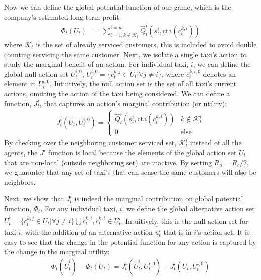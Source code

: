 \documentclass[journal]{IEEEtran}
\newcommand{\cta}{\mathrm{cta}}
\begin{document}
Now we can define the global potential function of our game, which is the company's estimated long-term profit. 
\begin{align*}
    \Phi_t(U_t) &= \sum_{i = 1, k \not \in \mathcal{K}_t}^{i=n_i} \hat{Q}_t^i( s^i_t, \cta(c^{k,i}_t)) 
\end{align*}
where $\mathcal{K}_t$ is the set of already serviced customers, this is included to avoid double counting servicing the same customer. 
Next, we isolate a single taxi's action to study the marginal benefit of an action. For individual taxi, $i$, we can define the global null action set $U^{i,0}_t$, $U^{i,0}_t = \{ c^{k,j}_t \in U_t | \forall j \neq i \}$, where $c^{k,i,0}_t$ denotes an element in  $U^{i,0}_t$. Intuitively, the null action set is the set of all taxi's current actions, omitting the action of the taxi being considered. We can define a function, $J_t^i$, that captures an action's marginal contribution (or utility):
\begin{align*}
    J_t^i(U_t, U^{i,0}_t) = 
    \begin{cases}
        \hat{Q}^i_t(s^i_t, \cta(c^{k,i}_t)) & k \not \in \mathcal{K}^i_t \\
        0 & \mathrm{else}
    \end{cases}
\end{align*}
By checking over the neighboring customer serviced set, $\mathcal{K}^i_t$ instead of all the agents, the $J^i$ function is local because the elements of the global action set $U_t$ that are non-local (outside neighboring set) are inactive. By setting $R_u = R_c/2$, we guarantee that any set of taxi's that can sense the same customers will also be neighbors. 

Next, we show that $J^i_t$ is indeed the marginal contribution on global potential function, $\Phi_t$. For any individual taxi, $i$, we define the global alternative action set $\tilde{U}^i_t = \{ c^{k,j}_t \in U_t | \forall j \neq i \} \bigcup \tilde{c}^{k,i}_t, \tilde{c}^{k,i}_t \in U^i_t$. Intuitively, this is the null action set for taxi $i$, with the addition of an alternative action $\tilde{u^i_t}$ that is in $i$'s action set. It is easy to see that the change in the potential function for any action is captured by the change in the marginal utility: 
\begin{align*}
    \Phi_t(\tilde{U}^i_t) - \Phi_t(U_t) = J^i_t(\tilde{U}^i_t, U^{i,0}_t) - J^i_t( U_t, U^{i,0}_t) 
\end{align*}
\end{document}
